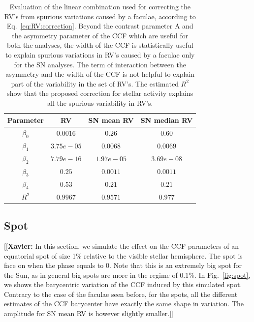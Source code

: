 \documentclass[11pt, oneside]{article}
\newcommand{\xavier}[1]{{\color{blue}[[\textbf{Xavier: }#1]]}}
\begin{document}
\begin{table}
\centering
\begin{tabular}{|c|c|c|c|}
\hline
Parameter          & RV         &   SN mean RV &   SN median RV \\
\hline
$\beta_{0}$            &    $0.0016$    & $0.26$ & $0.60$ \\
\hline
$\beta_{1}$            &    $3.75e-05$    & $0.0068$ & $0.0069$ \\
\hline
$\beta_{2}$            &     $7.79e-16$   &  $1.97e-05$ & $3.69e-08$\\
\hline
$\beta_{3}$            &     $0.25$   &  $0.0011$ & $0.0011$\\
\hline
$\beta_{4}$            &     $0.53$   &  $0.21$ & $0.21$\\
\hline
$R^{2}$      &     $0.9967$    &  $0.9571$ & $0.977$  \\
\hline
\end{tabular}
\caption{Evaluation of the linear combination used for correcting the RV's from spurious variations caused by a faculae, according to Eq.~\ref{eq:RV:correction}. Beyond the contrast parameter A and the asymmetry parameter of the CCF which are useful for both the analyses, the width of the CCF is statistically useful to explain spurious variations in RV's caused by a faculae only for the SN analyses. The term of interaction between the asymmetry and the width of the CCF is not helpful to explain part of the variability in the set of RV's. The estimated $R^{2}$ show that the proposed correction for stellar activity explains all the spurious variability in RV's.}
\label{table:faculae.test}
\end{table}

\subsection{Spot} \label{sec:soap.spot}

\xavier{In this section, we simulate the effect on the CCF parameters of an equatorial spot of size 1\% relative to the visible stellar hemisphere. The spot is face on when the phase equals to 0. Note that this is an extremely big spot for the Sun, as in general big spots are more in the regime of 0.1\%.
In Fig.~\ref{fig:spot}, we shows the barycentric variation of the CCF induced by this simulated spot. Contrary to the case of the faculae seen before, for the spots, all the different estimates of the CCF barycenter have exactly the same shape in variation. The amplitude for SN mean RV is however slightly smaller.} 
\end{document}
